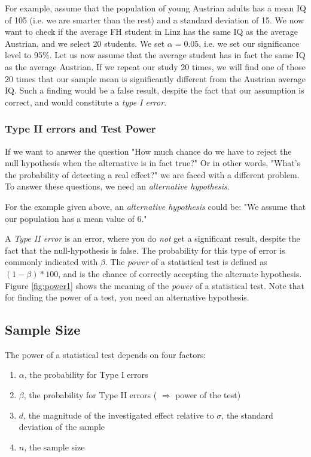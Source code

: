 For example, assume that the population of young Austrian adults has a mean IQ of 105 (i.e. we are smarter than the rest) and a standard deviation of 15. We now want to check if the average FH student in Linz has the same IQ as the average Austrian, and we select 20 students. We set $\alpha=0.05$, i.e. we set our significance level to 95\%.
Let us now assume that the average student has in fact the same IQ as the average Austrian. If we repeat our study 20 times, we will find one of those 20 times that our sample mean is significantly different from the Austrian average IQ. Such a finding would be a false result, despite the fact that our assumption is correct, and would constitute a \emph{type I error}.

\subsubsection{Type II errors and Test Power}
If we want to answer the question "How much chance do we have to reject the null hypothesis when the alternative is in fact true?" Or in other words, "What’s the probability of detecting a real effect?" we are faced with a different problem. To answer these questions, we need an \emph{alternative hypothesis}.

For the example given above, an \emph{alternative hypothesis} could be: "We assume that our population has a mean value of 6."

A \emph{Type II error} is an error, where you do \emph{not} get a significant result, despite the fact that the null-hypothesis is false. The probability for this type of error is commonly indicated with $\beta$. The \emph{power} of a statistical test is defined as $(1-\beta)*100$, and is the chance of correctly accepting the alternate hypothesis. Figure \ref{fig:power1} shows the meaning of the \emph{power} of a statistical test. Note that for finding the power of a test, you need an alternative hypothesis.

\subsection{Sample Size}
The power of a statistical test depends on four factors:

\begin{enumerate}
  \item  $\alpha$, the probability for Type I errors
  \item  $\beta$, the probability for Type II errors ( $\Rightarrow$ power of the test)
  \item  $d$, the magnitude of the investigated effect relative to $\sigma$, the standard deviation of the sample
  \item  $n$, the sample size
\end{enumerate}


